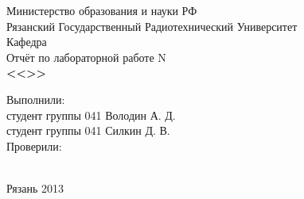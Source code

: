 \begin{titlepage}

\begin{center}
  Министерство образования и науки РФ \\
  Рязанский Государственный Радиотехнический Университет \\
  \vspace{0.2cm}
  Кафедра \\
  \vspace{18em}
  \Large Отчёт по лабораторной работе N  \\
  \textbf{<<>>} 
\end{center}

\vspace{14em}

\begin{flushright}
  Выполнили: \\ студент группы 041 Володин А. Д. \\
                студент группы 041 Силкин Д. В. \\
  \vspace{1.5em}
  Проверили: \\ 
             \\ 
\end{flushright}

\vspace{\fill}

\begin{center}
  Рязань 2013
\end{center}

\end{titlepage}